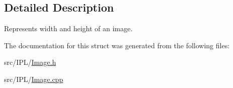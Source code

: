 \subsection{Detailed Description}
Represents width and height of an image. 

The documentation for this struct was generated from the following files:\begin{DoxyCompactItemize}
\item 
src/IPL/\hyperlink{Image_8h}{Image.h}\item 
src/IPL/\hyperlink{Image_8cpp}{Image.cpp}\end{DoxyCompactItemize}

